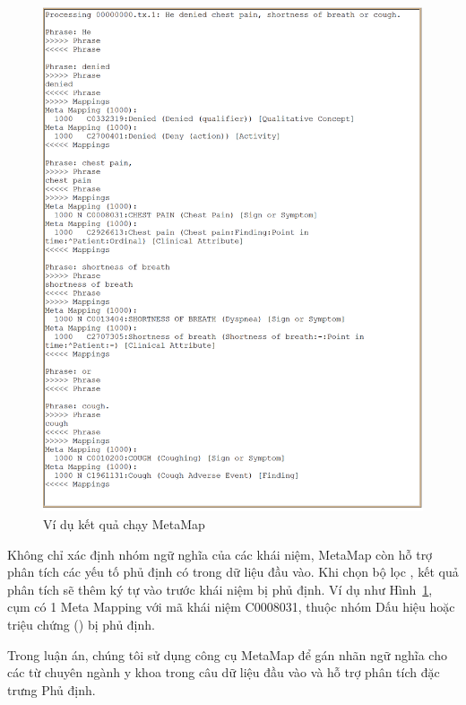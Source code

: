 \begin{figure}[h]
\centering
\includegraphics[scale=0.35]{../hinh/metamapsample.png}
\caption{Ví dụ kết quả chạy MetaMap}
\label{fig:metamapsample}
\end{figure}

Không chỉ xác định nhóm ngữ nghĩa của các khái niệm, MetaMap còn hỗ trợ phân tích các yếu tố phủ định có trong dữ liệu đầu vào. Khi chọn bộ lọc , kết quả phân tích sẽ thêm ký tự  vào trước khái niệm bị phủ định. Ví dụ như Hình~\ref{fig:metamapsample}, cụm  có 1 Meta Mapping với mã khái niệm C0008031, thuộc nhóm Dấu hiệu hoặc triệu chứng () bị phủ định.

Trong luận án, chúng tôi sử dụng công cụ MetaMap để gán nhãn ngữ nghĩa cho các từ chuyên ngành y khoa trong câu dữ liệu đầu vào và hỗ trợ phân tích đặc trưng Phủ định.
